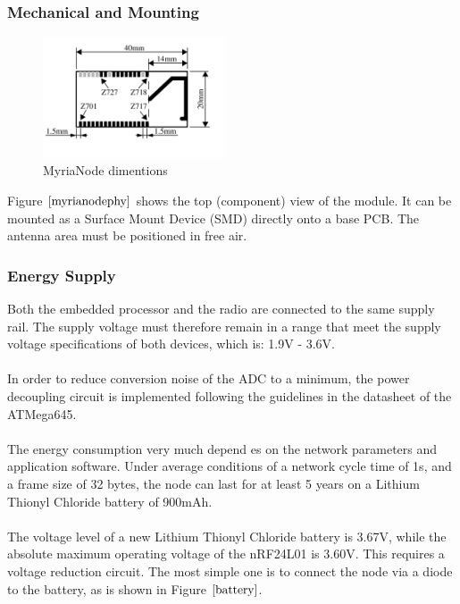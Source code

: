 \documentclass[a4paper,10pt]{report}
\begin{document}
\subsubsection{Mechanical and Mounting}
\begin{figure}
  \begin{center}
    \includegraphics[width=0.48\textwidth]{myrianodephy}
  \end{center}
  \caption{MyriaNode dimentions}
  \label{myrianodephy}
\end{figure}
Figure $\ref{myrianodephy}$ shows the top (component) view of the module. It can be mounted as a Surface Mount Device (SMD) directly onto a base PCB. The antenna area must be positioned in free air.
\subsubsection{Energy Supply}
Both the embedded processor and the radio are connected to the same supply rail. The supply voltage must therefore remain in a range that meet the supply voltage specifications of both devices, which is: 1.9V - 3.6V. \paragraph*{}
In order to reduce conversion noise of the ADC to a minimum, the power decoupling circuit is implemented following the guidelines in the datasheet of the ATMega645. \paragraph*{}
The energy consumption very much depend es on the network parameters and application software. Under average conditions of a network cycle time of 1s, and a frame size of 32 bytes, the node can last for at least 5 years on a Lithium Thionyl Chloride battery of 900mAh.
\paragraph*{}
The voltage level of a new Lithium Thionyl Chloride battery is 3.67V, while the absolute maximum operating voltage of the nRF24L01 is 3.60V. This requires a voltage reduction circuit. The most simple one is to connect the node via a diode to the battery, as is shown in Figure $\ref{battery}$.
\end{document}
